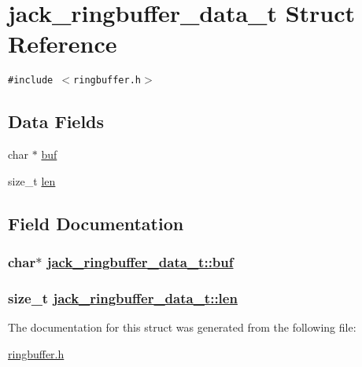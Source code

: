 \hypertarget{structjack__ringbuffer__data__t}{
\section{jack\_\-ringbuffer\_\-data\_\-t Struct Reference}
\label{structjack__ringbuffer__data__t}
}
{\tt \#include $<$ringbuffer.h$>$}

\subsection*{Data Fields}
\begin{CompactItemize}
\item 
char $\ast$ \hyperlink{structjack__ringbuffer__data__t_cb7e52b21171fb9a53b498202607f0bd}{buf}
\item 
size\_\-t \hyperlink{structjack__ringbuffer__data__t_f5a8e923f8cd24b56b3bab32358cc58a}{len}
\end{CompactItemize}


\subsection{Field Documentation}
\hypertarget{structjack__ringbuffer__data__t_cb7e52b21171fb9a53b498202607f0bd}{
\subsubsection[buf]{\setlength{\rightskip}{0pt plus 5cm}char$\ast$ \hyperlink{structjack__ringbuffer__data__t_cb7e52b21171fb9a53b498202607f0bd}{jack\_\-ringbuffer\_\-data\_\-t::buf}}}
\label{structjack__ringbuffer__data__t_cb7e52b21171fb9a53b498202607f0bd}


\hypertarget{structjack__ringbuffer__data__t_f5a8e923f8cd24b56b3bab32358cc58a}{
\subsubsection[len]{\setlength{\rightskip}{0pt plus 5cm}size\_\-t \hyperlink{structjack__ringbuffer__data__t_f5a8e923f8cd24b56b3bab32358cc58a}{jack\_\-ringbuffer\_\-data\_\-t::len}}}
\label{structjack__ringbuffer__data__t_f5a8e923f8cd24b56b3bab32358cc58a}




The documentation for this struct was generated from the following file:\begin{CompactItemize}
\item 
\hyperlink{ringbuffer_8h}{ringbuffer.h}\end{CompactItemize}
